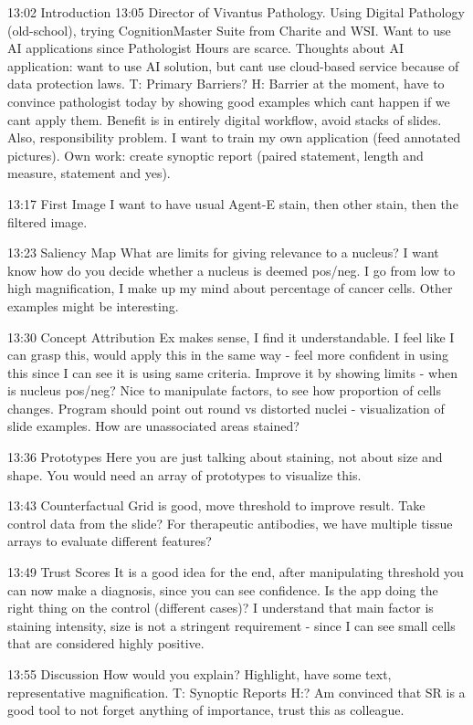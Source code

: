  13:02 Introduction
 13:05 Director of Vivantus Pathology. Using Digital Pathology (old-school), trying CognitionMaster Suite from Charite and WSI. Want to use AI applications since Pathologist Hours are scarce.
 Thoughts about AI application: want to use AI solution, but cant use cloud-based service because of data protection laws.
 T: Primary Barriers? H: Barrier at the moment, have to convince pathologist today by showing good examples which cant happen if we cant apply them. Benefit is in entirely digital workflow, avoid stacks of slides.
 Also, responsibility problem. I want to train my own application (feed annotated pictures). Own work: create synoptic report (paired statement, length and measure, statement and yes).
 
 13:17 First Image
 I want to have usual Agent-E stain, then other stain, then the filtered image. 
 
 13:23 Saliency Map
 What are limits for giving relevance to a nucleus? I want know how do you decide whether a nucleus is deemed pos/neg. I go from low to high magnification, I make up my mind about percentage of cancer cells.
 Other examples might be interesting.
 
 13:30 Concept Attribution
 Ex makes sense, I find it understandable. I feel like I can grasp this, would apply this in the same way - feel more confident in using this since I can see it is using same criteria.
 Improve it by showing limits - when is nucleus pos/neg? Nice to manipulate factors, to see how proportion of cells changes. Program should point out round vs distorted nuclei - visualization of slide examples.
 How are unassociated areas stained?
 
 13:36 Prototypes
 Here you are just talking about staining, not about size and shape. You would need an array of prototypes to visualize this. 
 
 13:43 Counterfactual
 Grid is good, move threshold to improve result. Take control data from the slide? For therapeutic antibodies, we have multiple tissue arrays to evaluate different features?
 
 13:49 Trust Scores
 It is a good idea for the end, after manipulating threshold you can now make a diagnosis, since you can see confidence. Is the app doing the right thing on the control (different cases)?
 I understand that main factor is staining intensity, size is not a stringent requirement - since I can see small cells that are considered highly positive. 
 
 13:55 Discussion
 How would you explain? Highlight, have some text, representative magnification. 
 T: Synoptic Reports H:? Am convinced that SR is a good tool to not forget anything of importance, trust this as colleague.
 
